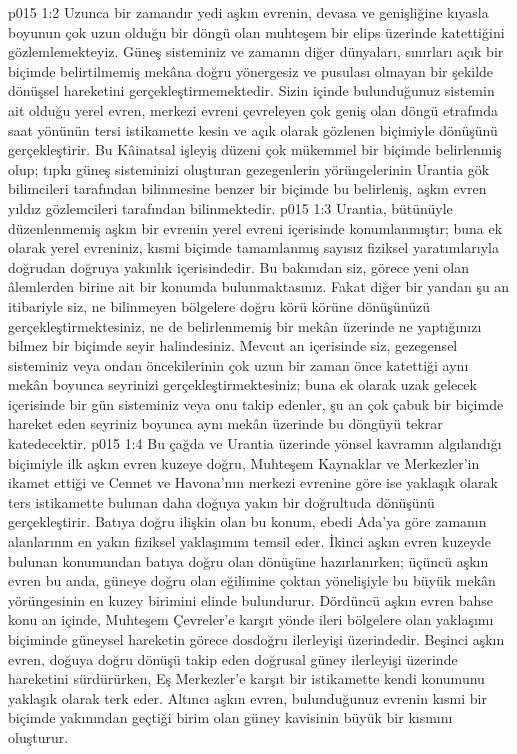 \vs p015 1:2 Uzunca bir zamandır yedi aşkın evrenin, devasa ve genişliğine kıyasla boyunun çok uzun olduğu bir döngü olan muhteşem bir elips üzerinde katettiğini gözlemlemekteyiz. Güneş sisteminiz ve zamanın diğer dünyaları, sınırları açık bir biçimde belirtilmemiş mekâna doğru yönergesiz ve pusulası olmayan bir şekilde dönüşsel hareketini gerçekleştirmemektedir. Sizin içinde bulunduğunuz sistemin ait olduğu yerel evren, merkezi evreni çevreleyen çok geniş olan döngü etrafında saat yönünün tersi istikamette kesin ve açık olarak gözlenen biçimiyle dönüşünü gerçekleştirir. Bu Kâinatsal işleyiş düzeni çok mükemmel bir biçimde belirlenmiş olup; tıpkı güneş sisteminizi oluşturan gezegenlerin yörüngelerinin Urantia gök bilimcileri tarafından bilinmesine benzer bir biçimde bu belirleniş, aşkın evren yıldız gözlemcileri tarafından bilinmektedir.
\vs p015 1:3 Urantia, bütünüyle düzenlenmemiş aşkın bir evrenin yerel evreni içerisinde konumlanmıştır; buna ek olarak yerel evreniniz, kısmi biçimde tamamlanmış sayısız fiziksel yaratımlarıyla doğrudan doğruya yakınlık içerisindedir. Bu bakımdan siz, görece yeni olan âlemlerden birine ait bir konumda bulunmaktasınız. Fakat diğer bir yandan şu an itibariyle siz, ne bilinmeyen bölgelere doğru körü körüne dönüşünüzü gerçekleştirmektesiniz, ne de belirlenmemiş bir mekân üzerinde ne yaptığınızı bilmez bir biçimde seyir halindesiniz. Mevcut an içerisinde siz, gezegensel sisteminiz veya ondan öncekilerinin çok uzun bir zaman önce katettiği aynı mekân boyunca seyrinizi gerçekleştirmektesiniz; buna ek olarak uzak gelecek içerisinde bir gün sisteminiz veya onu takip edenler, şu an çok çabuk bir biçimde hareket eden seyriniz boyunca aynı mekân üzerinde bu döngüyü tekrar katedecektir.
\vs p015 1:4 Bu çağda ve Urantia üzerinde yönsel kavramın algılandığı biçimiyle ilk aşkın evren kuzeye doğru, Muhteşem Kaynaklar ve Merkezler’in ikamet ettiği ve Cennet ve Havona’nın merkezi evrenine göre ise yaklaşık olarak ters istikamette bulunan daha doğuya yakın bir doğrultuda dönüşünü gerçekleştirir. Batıya doğru ilişkin olan bu konum, ebedi Ada’ya göre zamanın alanlarının en yakın fiziksel yaklaşımını temsil eder. İkinci aşkın evren kuzeyde bulunan konumundan batıya doğru olan dönüşüne hazırlanırken; üçüncü aşkın evren bu anda, güneye doğru olan eğilimine çoktan yönelişiyle bu büyük mekân yörüngesinin en kuzey birimini elinde bulundurur. Dördüncü aşkın evren bahse konu an içinde, Muhteşem Çevreler’e karşıt yönde ileri bölgelere olan yaklaşımı biçiminde güneysel hareketin görece dosdoğru ilerleyişi üzerindedir. Beşinci aşkın evren, doğuya doğru dönüşü takip eden doğrusal güney ilerleyişi üzerinde hareketini sürdürürken, Eş Merkezler’e karşıt bir istikamette kendi konumunu yaklaşık olarak terk eder. Altıncı aşkın evren, bulunduğunuz evrenin kısmi bir biçimde yakınından geçtiği birim olan güney kavisinin büyük bir kısmını oluşturur.
